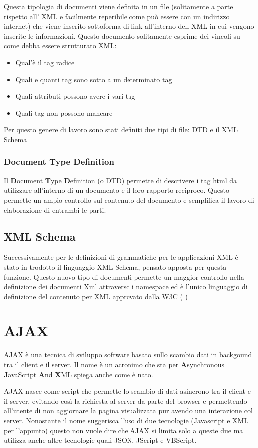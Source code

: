 \documentclass{article}
\begin{document}
Questa tipologia di documenti viene definita in un file (solitamente a parte rispetto all' XML e facilmente reperibile come può essere con un indirizzo internet) che viene inserito sottoforma di link all'interno dell XML in cui vengono inserite le informazioni. Questo documento solitamente esprime dei vincoli su come debba essere strutturato XML: 
\begin{itemize}
\item Qual'è il tag radice
\item Quali e quanti tag sono sotto a un determinato tag
\item Quali attributi possono avere i vari tag
\item Quali tag non possono mancare 
\end{itemize}

Per questo genere di lavoro sono stati definiti due tipi di file: DTD e il XML Schema 

\subsubsection{Document Type Definition}
Il \textbf{D}ocument \textbf{T}ype \textbf{D}efinition (o DTD) permette di descrivere i tag html da utilizzare all'interno di un documento e il loro rapporto reciproco. Questo permette un ampio controllo sul contenuto del documento e semplifica il lavoro di elaborazione di entrambi le parti. 

\subsection{XML Schema}
Successivamente per le definizioni di grammatiche per le applicazioni XML è stato in trodotto il linguaggio XML Schema, pensato apposta per questa funzione. Questo nuovo tipo di documenti permette un maggior controllo nella definizione dei documenti Xml attraverso i namespace ed è l'unico linguaggio di definizione del contenuto per XML approvato dalla W3C (\cite{site:w3cxmlschame} )


\section{AJAX}
AJAX è una tecnica di sviluppo software basato sullo scambio dati in backgound tra il client e il server.  Il nome è un acronimo che sta per \textbf{A}synchronous \textbf{J}avaScript \textbf{A}nd \textbf{X}ML spiega anche come è nato.

AJAX nasce come script che permette lo scambio di dati asincrono tra il client e il server, evitando così la richiesta al server da parte del browser e permettendo all'utente di non aggiornare la pagina visualizzata pur avendo una interazione col server. Nonostante il nome suggerisca l'uso di due tecnologie (Javascript e XML per l'appunto) questo non vuole dire che AJAX si limita solo a queste due ma utilizza anche altre tecnologie quali JSON, JScript e VBScript.
\end{document}
